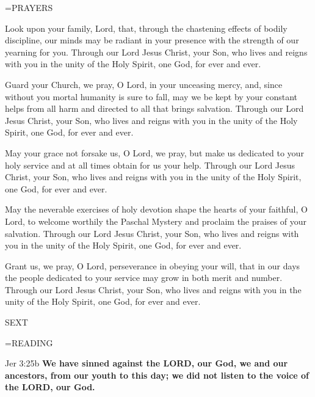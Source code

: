 \hangindent=\parindent \small PRAYERS
\begin{description}[labelindent=\parindent, leftmargin=*]
\item [Week 1:] 	Look upon your family, Lord, that, through the chastening effects of bodily discipline, our minds may be radiant in your presence with the strength of our yearning for you. Through our Lord Jesus Christ, your Son, who lives and reigns with you in the unity of the Holy Spirit, one God, for ever and ever.
\item [Week 2:] 	Guard your Church, we pray, O Lord, in your unceasing mercy, and, since without you mortal humanity is sure to fall, may we be kept by your constant helps from all harm and directed to all that brings salvation. Through our Lord Jesus Christ, your Son, who lives and reigns with you in the unity of the Holy Spirit, one God, for ever and ever.
\item [Week 3:] 	May your grace not forsake us, O Lord, we pray, but make us dedicated to your holy service and at all times obtain for us your help. Through our Lord Jesus Christ, your Son, who lives and reigns with you in the unity of the Holy Spirit, one God, for ever and ever.
\item [Week 4:] 	May the neverable exercises of holy devotion shape the hearts of your faithful, O Lord, to welcome worthily the Paschal Mystery and proclaim the praises of your salvation. Through our Lord Jesus Christ, your Son, who lives and reigns with you in the unity of the Holy Spirit, one God, for ever and ever.
\item [Week 5:] 	Grant us, we pray, O Lord, perseverance in obeying your will, that in our days the people dedicated to your service may grow in both merit and number. Through our Lord Jesus Christ, your Son, who lives and reigns with you in the unity of the Holy Spirit, one God, for ever and ever.
\end{description}

\begin{flushleft}\normalsize SEXT\\\end{flushleft}
\hangindent=\parindent \small READING
\begin{description}[labelindent=\parindent, leftmargin=*]
\item [Weeks 1-4:]     Jer 3:25b \textbf{    We have sinned against the LORD, our God, we and our ancestors, from our youth to this day; we did not listen to the voice of the LORD, our God.\\}
\end{description}


